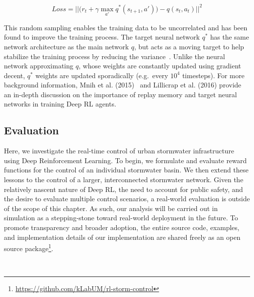 \begin{equation}
    Loss = ||\big( r_t + \gamma \max_{a'} q^* (s_{t+1},a')\big) - q(s_t,a_t) ||^2
\end{equation}

This random sampling enables the training data to be uncorrelated and has been found to improve the training process.
The target neural network  $q^*$ has the same network architecture as the main network $q$, but acts as a moving target to help stabilize the training process by reducing the variance~\cite{Mnih2015}.
Unlike the neural network approximating $q$, whose weights are constantly updated using gradient decent, $q^*$  weights are updated sporadically (e.g.\ every $10^4$ timesteps).
For more background information, Mnih et al. (2015)~\cite{Mnih2015} and Lillicrap et al.  (2016)\cite{Lillicrap2015ContinuousLearning} provide an in-depth discussion on the importance of replay memory and target neural networks in training Deep RL agents.



\subsection{Evaluation}
Here, we investigate the real-time control of urban stormwater infrastructure using Deep Reinforcement Learning.
To begin, we formulate and evaluate reward functions for the control of an individual stormwater basin.
We then extend these lessons to the control of a larger, interconnected stormwater network.
Given the relatively nascent nature of Deep RL, the need to account for public safety, and the desire to evaluate multiple control scenarios, a real-world evaluation is outside of the scope of this chapter.
As such, our analysis will be carried out in simulation as a stepping-stone toward real-world deployment in the future.
To promote transparency and broader adoption, the entire source code, examples, and implementation details of our implementation are shared freely as an open source package\footnote{\href{https://github.com/kLabUM/rl-storm-control}{https://github.com/kLabUM/rl-storm-control}}.

\

